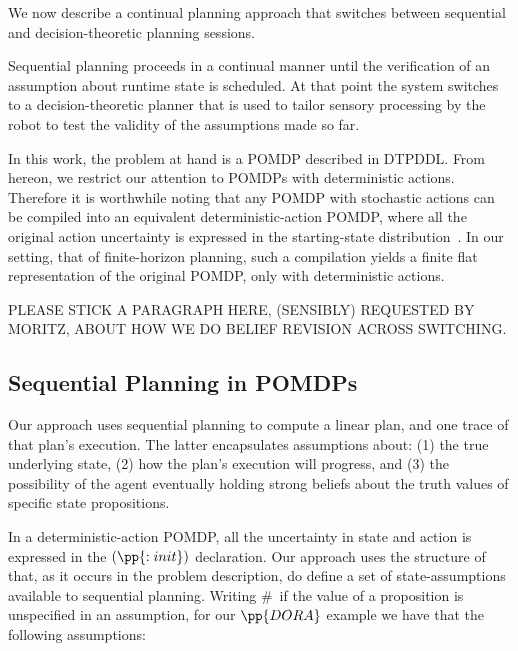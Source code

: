 

We now describe a continual planning approach that switches between
sequential and decision-theoretic planning sessions. 

Sequential planning proceeds in a continual manner until the
verification of an assumption about runtime state is scheduled. At
that point the system switches to a decision-theoretic planner that is
used to tailor sensory processing by the robot to test the validity of
the assumptions made so far.

In this work, the problem at hand is a POMDP described in DTPDDL. From
hereon, we restrict our attention to POMDPs with deterministic
actions. Therefore it is worthwhile noting that any POMDP with
stochastic actions can be compiled into an equivalent
deterministic-action POMDP, where all the original action uncertainty
is expressed in the starting-state
distribution~\cite{ng:Jordan:2000}. In our setting, that of
finite-horizon planning, such a compilation yields a finite flat
representation of the original POMDP, only with deterministic
actions. 


PLEASE STICK A PARAGRAPH HERE, (SENSIBLY) REQUESTED BY MORITZ, ABOUT
HOW WE DO BELIEF REVISION ACROSS SWITCHING.


\subsection{Sequential Planning in POMDPs}


Our approach uses sequential planning to compute a linear plan, and
one trace of that plan's execution. The latter encapsulates
assumptions about: (1) the true underlying state, (2) how the plan's
execution will progress, and (3) the possibility of the agent
eventually holding strong beliefs about the truth values of specific
state propositions.

In a deterministic-action POMDP, all the uncertainty in state and
action is expressed in the $(\pp{:init})$ declaration. Our approach
uses the structure of that, as it occurs in the problem description,
do define a set of state-assumptions available to sequential planning.
Writing \#\ if the value of a proposition is unspecified in an
assumption, for our $\pp{DORA}$ example we have that the following
assumptions:


